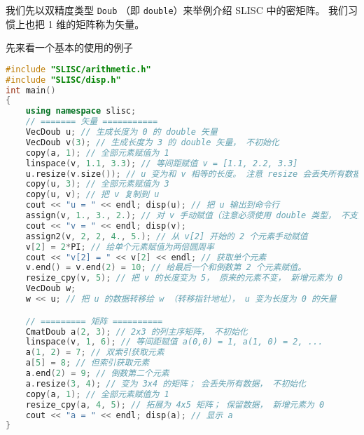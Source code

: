 
\begin{issues}
\issueDraft
\end{issues}


我们先以双精度类型 \verb|Doub| （即 \verb|double|）来举例介绍 SLISC 中的密矩阵。 我们习惯上也把 1 维的矩阵称为矢量。

先来看一个基本的使用的例子
\begin{lstlisting}[language=cpp]
#include "SLISC/arithmetic.h"
#include "SLISC/disp.h"
int main()
{
    using namespace slisc;
    // ======= 矢量 ===========
    VecDoub u; // 生成长度为 0 的 double 矢量
    VecDoub v(3); // 生成长度为 3 的 double 矢量， 不初始化
    copy(a, 1); // 全部元素赋值为 1
    linspace(v, 1.1, 3.3); // 等间距赋值 v = [1.1, 2.2, 3.3]
    u.resize(v.size()); // u 变为和 v 相等的长度。 注意 resize 会丢失所有数据
    copy(u, 3); // 全部元素赋值为 3
    copy(u, v); // 把 v 复制到 u
    cout << "u = " << endl; disp(u); // 把 u 输出到命令行
    assign(v, 1., 3., 2.); // 对 v 手动赋值（注意必须使用 double 类型， 不支持自动转换）
    cout << "v = " << endl; disp(v);
    assign2(v, 2, 2, 4., 5.); // 从 v[2] 开始的 2 个元素手动赋值
    v[2] = 2*PI; // 给单个元素赋值为两倍圆周率
    cout << "v[2] = " << v[2] << endl; // 获取单个元素
    v.end() = v.end(2) = 10; // 给最后一个和倒数第 2 个元素赋值。
    resize_cpy(v, 5); // 把 v 的长度变为 5， 原来的元素不变， 新增元素为 0
    VecDoub w;
    w << u; // 把 u 的数据转移给 w （转移指针地址）， u 变为长度为 0 的矢量

    // ========= 矩阵 ==========
    CmatDoub a(2, 3); // 2x3 的列主序矩阵， 不初始化
    linspace(v, 1, 6); // 等间距赋值 a(0,0) = 1, a(1, 0) = 2, ...
    a(1, 2) = 7; // 双索引获取元素
    a[5] = 8; // 但索引获取元素
    a.end(2) = 9; // 倒数第二个元素
    a.resize(3, 4); // 变为 3x4 的矩阵； 会丢失所有数据， 不初始化
    copy(a, 1); // 全部元素赋值为 1
    resize_cpy(a, 4, 5); // 拓展为 4x5 矩阵； 保留数据， 新增元素为 0
    cout << "a = " << endl; disp(a); // 显示 a
}
\end{lstlisting}

